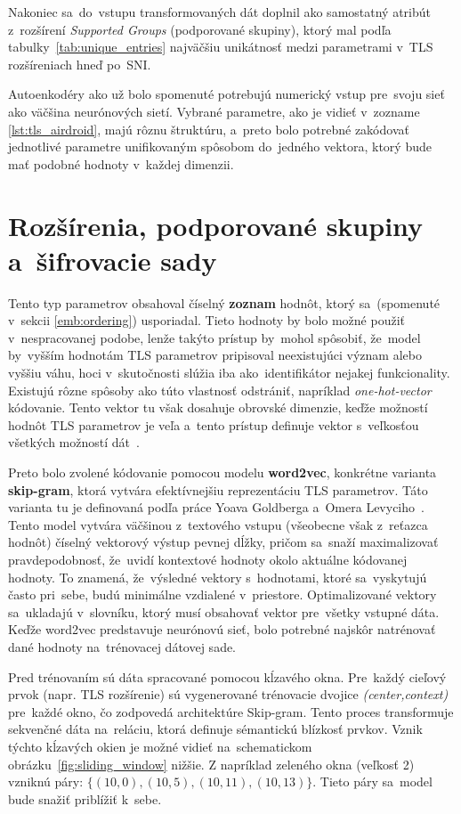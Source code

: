 Nakoniec sa~do~vstupu transformovaných dát doplnil ako samostatný atribút z~rozšírení \textit{Supported Groups} (podporované skupiny), ktorý mal podľa tabulky~\ref{tab:unique_entries} najväčšiu unikátnosť medzi parametrami v~TLS rozšíreniach hneď po~SNI.

Autoenkodéry ako už bolo spomenuté potrebujú numerický vstup pre~svoju sieť ako väčšina neurónových sietí. Vybrané parametre, ako je vidieť v~zozname \ref{lst:tls_airdroid}, majú rôznu štruktúru, a~preto bolo potrebné zakódovať jednotlivé parametre
unifikovaným spôsobom do~jedného vektora, ktorý bude mať podobné hodnoty v~každej dimenzii.

\section{Rozšírenia, podporované skupiny a~šifrovacie sady}\label{emb:list_embedding}
Tento typ parametrov obsahoval číselný \textbf{zoznam} hodnôt, ktorý sa~(spomenuté v~sekcii \ref{emb:ordering}) usporiadal. Tieto hodnoty by bolo možné použiť v~nespracovanej podobe, lenže takýto prístup by~mohol spôsobiť, že~model by~vyšším hodnotám TLS parametrov pripisoval neexistujúci význam alebo vyššiu váhu, hoci v~skutočnosti slúžia iba ako~identifikátor nejakej funkcionality. Existujú rôzne spôsoby ako túto vlastnosť odstrániť, napríklad \textit{one-hot-vector} kódovanie. Tento vektor tu však dosahuje obrovské dimenzie, keďže možností hodnôt TLS parametrov je veľa a~tento prístup definuje vektor s~veľkosťou všetkých možností dát~\cite{app_identification}. 

Preto bolo zvolené kódovanie pomocou modelu \textbf{word2vec}\label{emb:word2vec}, konkrétne varianta \textbf{skip-gram}, ktorá vytvára efektívnejšiu reprezentáciu TLS parametrov. Táto varianta tu je definovaná podľa práce Yoava Goldberga a~Omera Levyciho~\cite{word2vec}. Tento model vytvára väčšinou z~textového vstupu (všeobecne však z~reťazca hodnôt) číselný vektorový výstup pevnej dĺžky, pričom sa~snaží maximalizovať pravdepodobnosť, že~uvidí kontextové hodnoty okolo aktuálne kódovanej hodnoty. To znamená, že~výsledné vektory s~hodnotami, ktoré sa~vyskytujú často pri~sebe, budú minimálne vzdialené v~priestore. Optimalizované vektory sa~ukladajú v~slovníku, ktorý musí obsahovať vektor pre~všetky vstupné dáta. Keďže word2vec predstavuje neurónovú sieť, bolo potrebné najskôr natrénovať dané hodnoty na~trénovacej dátovej sade.  

Pred trénovaním sú dáta spracované pomocou kĺzavého okna. Pre~každý cieľový prvok (napr. TLS rozšírenie) sú vygenerované trénovacie dvojice \textit{(center,context)} pre~každé okno, čo zodpovedá architektúre Skip-gram. Tento proces transformuje sekvenčné dáta na~reláciu, ktorá definuje sémantickú blízkosť prvkov. Vznik týchto kĺzavých okien je možné vidieť na~schematickom obrázku~\ref{fig:sliding_window} nižšie. Z napríklad zeleného okna (veľkosť 2) vzniknú páry: 
$\{ (10,0), (10,5), (10,11), (10,13) \}$. Tieto páry sa~model bude snažiť priblížiť k~sebe.

